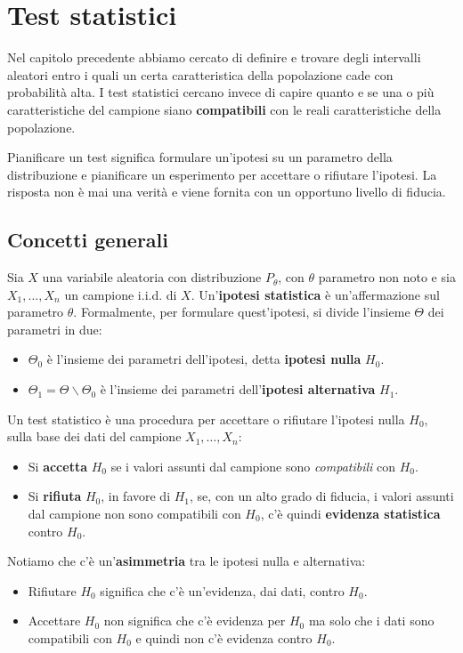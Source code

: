\chapter{Test statistici}
Nel capitolo precedente abbiamo cercato di definire e trovare degli intervalli aleatori entro i
quali un certa caratteristica della popolazione cade con probabilità alta. I test statistici
cercano invece di capire quanto e se una o più caratteristiche del campione siano
\textbf{compatibili} con le reali caratteristiche della popolazione.

Pianificare un test significa formulare un'ipotesi su un parametro della distribuzione e
pianificare un esperimento per accettare o rifiutare l'ipotesi. La risposta non è mai una verità
e viene fornita con un opportuno livello di fiducia.

\section{Concetti generali}
Sia $X$ una variabile aleatoria con distribuzione $P_\theta$, con $\theta$ parametro non noto e
sia $X_1, \dots, X_n$ un campione i.i.d. di $X$. Un'\textbf{ipotesi statistica} è un'affermazione
sul parametro $\theta$. Formalmente, per formulare quest'ipotesi, si divide l'insieme $\Theta$ dei
parametri in due:
\begin{itemize}
	\item $\Theta_0$ è l'insieme dei parametri dell'ipotesi, detta \textbf{ipotesi nulla} $H_0$.
	\item $\Theta_1 = \Theta \backslash \Theta_0$ è l'insieme dei parametri
	      dell'\textbf{ipotesi alternativa} $H_1$.
\end{itemize}
Un test statistico è una procedura per accettare o rifiutare l'ipotesi nulla $H_0$, sulla base dei
dati del campione $X_1, \dots, X_n$:
\begin{itemize}
	\item Si \textbf{accetta} $H_0$ se i valori assunti dal campione sono \emph{compatibili} con
	      $H_0$.
	\item Si \textbf{rifiuta} $H_0$, in favore di $H_1$, se, con un alto grado di fiducia, i valori
	      assunti dal campione non sono compatibili con $H_0$, c'è quindi \textbf{evidenza statistica}
	      contro $H_0$.
\end{itemize}

\begin{observation}
	Notiamo che c'è un'\textbf{asimmetria} tra le ipotesi nulla e alternativa:
	\begin{itemize}
		\item Rifiutare $H_0$ significa che c'è un'evidenza, dai dati, contro $H_0$.
		\item Accettare $H_0$ non significa che c'è evidenza per $H_0$ ma solo che i dati sono
		      compatibili con $H_0$ e quindi non c'è evidenza contro $H_0$.
	\end{itemize}
\end{observation}

